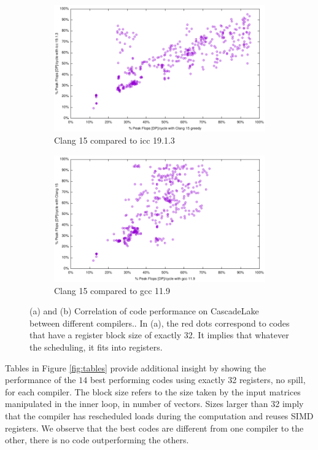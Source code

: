 \documentclass{article}
\begin{document}
\begin{figure}[h!]
  \begin{subfigure}[h]{0.45\textwidth}
  \includegraphics[width=\textwidth]{../benches/gemm/cascadelake-64x256x64/icc21xicc19.pdf}
  \caption{Clang 15 compared to icc 19.1.3}
  \end{subfigure}
  \begin{subfigure}[h]{0.45\textwidth}  
\includegraphics[width=\textwidth]{../benches/gemm/cascadelake-64x256x64/gccxgreedy.pdf}
  \caption{Clang 15 compared to gcc 11.9}
  \end{subfigure}

  \caption{(a) and (b) Correlation of code performance on CascadeLake between different compilers.\label{fig:cascadelakecorrelation}. In (a), the red dots correspond to codes that have a register block size of exactly 32. It implies that whatever the scheduling, it fits into registers.}
\end{figure}
Tables in Figure \ref{fig:tables} provide additional insight by showing the
performance of the $14$  best performing  codes using exactly 32 registers, no spill, for each compiler. The
block size refers to the size taken by the input matrices manipulated
in the inner loop, in number of vectors. Sizes larger than 32 imply that the compiler has rescheduled loads during the computation and reuses SIMD registers. We observe that the best codes are different from one compiler to the other, there is no code outperforming the others.
\end{document}
